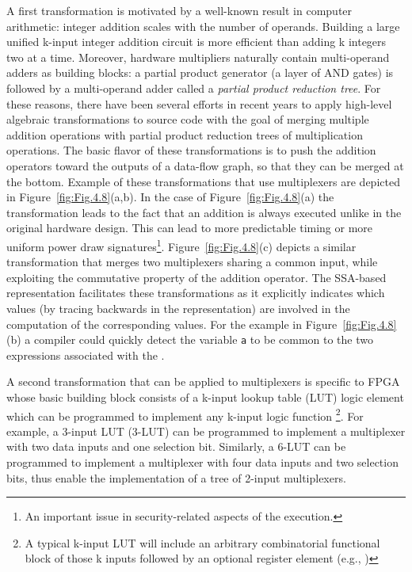 A first transformation is motivated by a well-known result in computer arithmetic: 
integer addition scales with the number of operands. 
Building a large unified k-input integer addition circuit is more efficient than adding k integers two at a time. 
Moreover, hardware multipliers naturally contain multi-operand adders as building blocks: 
a partial product generator (a layer of AND gates) is followed by a multi-operand adder called a {\em partial product reduction tree}. 
For these reasons, there have been several efforts in recent years to apply high-level algebraic transformations to source code with the goal of merging multiple addition operations with partial product reduction trees of multiplication operations. 
The basic flavor of these transformations is to push the addition operators toward the outputs of a data-flow graph, so that they can be merged at the bottom. 
Example of these transformations that use multiplexers are depicted in Figure~\ref{fig:Fig.4.8}(a,b). 
In the case of Figure~\ref{fig:Fig.4.8}(a) the transformation leads to the fact that an addition is always executed unlike in the original hardware design. This can lead to more predictable timing or more uniform power draw signatures\footnote{An important issue in security-related aspects of the execution.}.
Figure~\ref{fig:Fig.4.8}(c) depicts a similar transformation that merges two multiplexers sharing a common input, while exploiting the commutative property of the addition operator. 
The SSA-based representation facilitates these transformations as it explicitly indicates which values (by tracing backwards in the representation) are involved in the computation of the corresponding values. 
For the example in Figure~\ref{fig:Fig.4.8}(b) a compiler could quickly detect the variable {\tt a} to be common  to the two expressions associated with the \phifun.

A second transformation that can be applied to multiplexers is specific to FPGA whose basic building block consists of a k-input lookup table (LUT) logic element which can be programmed to implement any k-input logic function \footnote{A typical k-input LUT will include an arbitrary combinatorial functional block of those k inputs followed by an optional register element (e.g.,  )}.
For example, a 3-input LUT (3-LUT) can be programmed to implement a multiplexer with two data inputs and one selection bit.  Similarly, a 6-LUT can be programmed to implement a multiplexer with four data inputs and two selection bits, thus enable the implementation of a tree of 2-input multiplexers.\\

